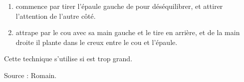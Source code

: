 \begin{technique}

\begin{enumerate}
	\item \A commence par tirer l'épaule gauche de \D pour déséquilibrer, et attirer l'attention de l'autre côté.
	
	\item \A attrape \D par le cou avec sa main gauche et le tire en arrière, et de la main droite il plante dans le creux entre le cou et l'épaule.
\end{enumerate}

Cette technique s'utilise si \D est trop grand.

Source : Romain.
\end{technique}
